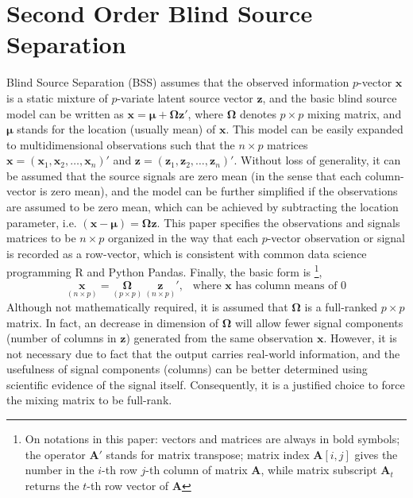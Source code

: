 \documentclass[utf8,english]{gradu3}
\begin{document}
\chapter{Second Order Blind Source Separation}

Blind Source Separation (BSS) assumes that the observed information $p$-vector $\boldsymbol{x}$ is a static mixture of $p$-variate latent source vector $\boldsymbol{z}$, and the basic blind source model can be written as $\boldsymbol{x} = \boldsymbol{\mu} + \boldsymbol{\Omega z}'$, where $\boldsymbol{\Omega}$ denotes $p\times p$ mixing matrix, and $\boldsymbol{\mu}$ stands for the location (usually mean) of $\boldsymbol{x}$. This model can be easily expanded to multidimensional observations such that the $n\times p$ matrices $\boldsymbol{x}=(\boldsymbol{x}_1, \boldsymbol{x}_2,\dots,\boldsymbol{x}_n)'$ and $\boldsymbol{z}=(\boldsymbol{z}_1, \boldsymbol{z}_2,\dots,\boldsymbol{z}_n)'$. Without loss of generality, it can be assumed that the source signals are zero mean (in the sense that each column-vector is zero mean), and the model can be further simplified if the observations are assumed to be zero mean, which can be achieved by subtracting the location parameter, i.e. $(\boldsymbol{x} - \boldsymbol{\mu}) = \boldsymbol{\Omega z}$. This paper specifies the observations and signals matrices to be $n\times p$ organized in the way that each $p$-vector observation or signal is recorded as a row-vector, which is consistent with common data science programming R and Python Pandas. Finally, the basic form is \footnote{On notations in this paper: vectors and matrices are always in bold symbols; the operator $\boldsymbol{A}'$ stands for matrix transpose; matrix index $\boldsymbol{A}[i,j]$ gives the number in the $i$-th row $j$-th column of matrix $\boldsymbol{A}$, while matrix subscript $\boldsymbol{A}_t$ returns the $t$-th row vector of $\boldsymbol{A}$},
\begin{equation*}
\label{eq:SOM}
    \underset{(n\times p)}{\boldsymbol x} = \underset{(p\times p)}{\boldsymbol{\Omega}} \ \underset{(n\times p)}{\boldsymbol{z}}', \ \ \text{ where } \boldsymbol{x} \text{ has column means of }0
\end{equation*}
Although not mathematically required, it is assumed that $\boldsymbol{\Omega}$ is a full-ranked $p\times p$ matrix. In fact, an decrease in dimension of $\boldsymbol{\Omega}$ will allow fewer signal components (number of columns in $\boldsymbol z$) generated from the same observation $\boldsymbol{x}$. However, it is not necessary due to fact that the output carries real-world information, and the usefulness of signal components (columns) can be better determined using scientific evidence of the signal itself. Consequently, it is a justified choice to force the mixing matrix to be full-rank.
\end{document}
